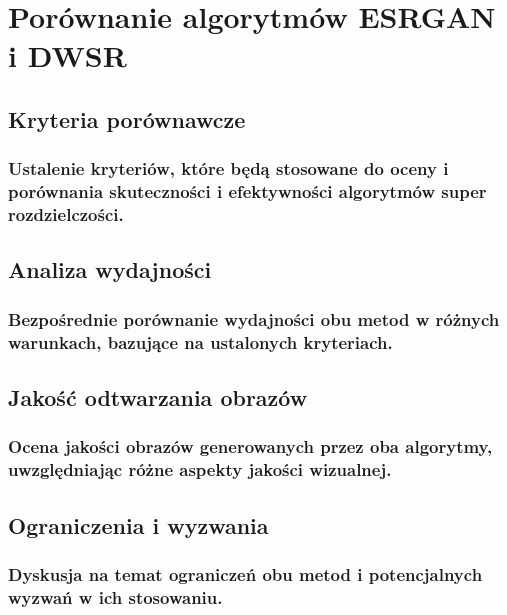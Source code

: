 \chapter{Porównanie algorytmów ESRGAN i DWSR}
\section{Kryteria porównawcze}
\subsection{Ustalenie kryteriów, które będą stosowane do oceny i porównania skuteczności i efektywności algorytmów super rozdzielczości.}
\section{Analiza wydajności}
\subsection{Bezpośrednie porównanie wydajności obu metod w różnych warunkach, bazujące na ustalonych kryteriach.}
\section{Jakość odtwarzania obrazów}
\subsection{Ocena jakości obrazów generowanych przez oba algorytmy, uwzględniając różne aspekty jakości wizualnej.}
\section{Ograniczenia i wyzwania}
\subsection{Dyskusja na temat ograniczeń obu metod i potencjalnych wyzwań w ich stosowaniu.}